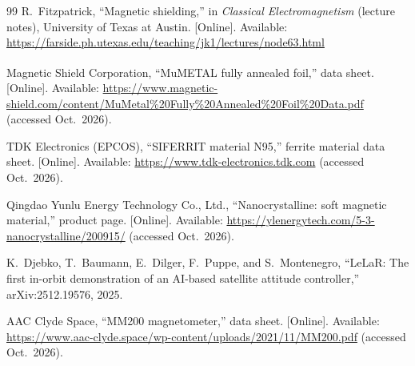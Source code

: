 \documentclass[12pt,a4paper]{article}
\begin{document}
\begin{thebibliography}{99}
R.\ Fitzpatrick, ``Magnetic shielding,'' in \emph{Classical Electromagnetism} (lecture notes), University of Texas at Austin. [Online]. Available: \url{https://farside.ph.utexas.edu/teaching/jk1/lectures/node63.html}

Magnetic Shield Corporation, ``MuMETAL\textsuperscript{\textregistered} fully annealed foil,'' data sheet. [Online]. Available: \url{https://www.magnetic-shield.com/content/MuMetal%20Fully%20Annealed%20Foil%20Data.pdf} (accessed Oct.\ 2026).

TDK Electronics (EPCOS), ``SIFERRIT material N95,'' ferrite material data sheet. [Online]. Available: \url{https://www.tdk-electronics.tdk.com} (accessed Oct.\ 2026).

Qingdao Yunlu Energy Technology Co., Ltd., ``Nanocrystalline: soft magnetic material,'' product page. [Online]. Available: \url{https://ylenergytech.com/5-3-nanocrystalline/200915/} (accessed Oct.\ 2026).

K.\ Djebko, T.\ Baumann, E.\ Dilger, F.\ Puppe, and S.\ Montenegro, ``LeLaR: The first in-orbit demonstration of an AI-based satellite attitude controller,'' arXiv:2512.19576, 2025.

AAC Clyde Space, ``MM200 magnetometer,'' data sheet. [Online]. Available: \url{https://www.aac-clyde.space/wp-content/uploads/2021/11/MM200.pdf} (accessed Oct.\ 2026).

\end{thebibliography}
\end{document}
